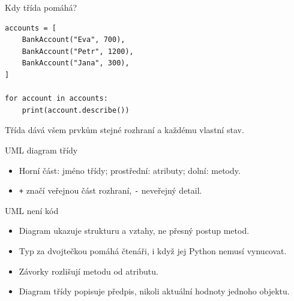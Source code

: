 \documentclass[aspectratio=169]{beamer}
\begin{document}
\begin{frame}[fragile]{Kdy třída pomáhá?}
\begin{lstlisting}[style=python]
accounts = [
    BankAccount("Eva", 700),
    BankAccount("Petr", 1200),
    BankAccount("Jana", 300),
]

for account in accounts:
    print(account.describe())
\end{lstlisting}
  Třída dává všem prvkům stejné rozhraní a každému vlastní stav.
\end{frame}

\begin{frame}{UML diagram třídy}
  \centering
  \begin{itemize}
    \item Horní část: jméno třídy; prostřední: atributy; dolní: metody.
    \item \texttt{+} značí veřejnou část rozhraní, \texttt{-} neveřejný detail.
  \end{itemize}
\end{frame}

\begin{frame}{UML není kód}
  \begin{itemize}
    \item Diagram ukazuje strukturu a vztahy, ne přesný postup metod.
    \item Typ za dvojtečkou pomáhá čtenáři, i když jej Python nemusí vynucovat.
    \item Závorky rozlišují metodu od atributu.
    \item Diagram třídy popisuje předpis, nikoli aktuální hodnoty jednoho objektu.
  \end{itemize}
\end{frame}
\end{document}
